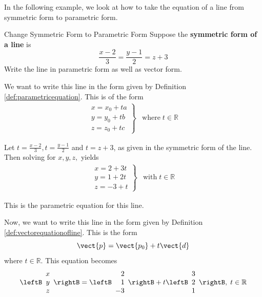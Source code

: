 In the following example, we look at how to take the equation of a line from symmetric form to 
parametric form.

\begin{example}{Change Symmetric Form to Parametric Form}\label{exa:symmetrictoparametric}
Suppose the
\textbf{symmetric form of a line} is
\begin{equation*}
\frac{x-2}{3}=\frac{y-1}{2}=z+3
\end{equation*}
Write the line in parametric form as well as vector form.
\end{example}

\begin{solution}
We want to write this line in the form given by Definition \ref{def:parametricequation}. This is of the form 
\begin{equation*}
\begin{array}{ll}
\left.
\begin{array}{c}
x = x_0 + ta \\
y = y_0 + tb \\
z = z_0 + tc
\end{array}
\right\} & 
\mbox{where} \; t\in \mathbb{R} 
\end{array}
\end{equation*}

Let $t=\frac{x-2}{3},t=\frac{y-1}{2}$ and $t=z+3$, as given in the symmetric form of the line.
 Then solving for $x,y,z,$
yields
\begin{equation*}
\begin{array}{ll}
\left.
\begin{array}{c}
x=2 + 3t \\
y=1 + 2t \\
z=-3 + t 
\end{array}
\right\} & 
\mbox{with} \;t\in \mathbb{R}
\end{array}
\end{equation*}

This is the parametric equation for this line. 

Now, we want to write this line in the form given by Definition \ref{def:vectorequationofline}.
This is the form 
\begin{equation*}
\vect{p}=\vect{p_0}+t\vect{d}
\end{equation*}
where $t\in \mathbb{R}$.
This equation becomes
\begin{equation*}
\leftB
\begin{array}{c}
x \\
y \\
z
\end{array}
\rightB =
\leftB
\begin{array}{r}
2 \\
1 \\
-3 
\end{array}
\rightB
+
t
\leftB
\begin{array}{r}
3 \\
2 \\
1 
\end{array}
\rightB,
\;t\in
\mathbb{R}
\end{equation*}
\end{solution}
